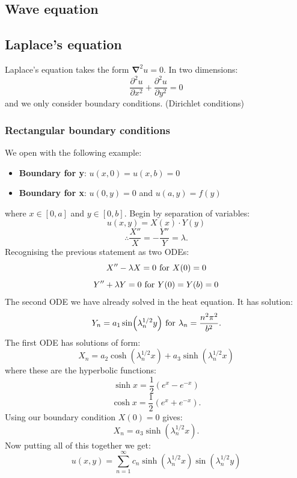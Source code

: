 \documentclass{article}
\begin{document}
\newpage

\subsection{Wave equation}

\newpage

\subsection{Laplace's equation}
Laplace's equation takes the form $\boldsymbol{\nabla}^2 u=0$. In two dimensions:
$$\frac{\partial^2 u}{\partial x^2}+\frac{\partial^2 u}{\partial y^2}=0$$
and we only consider boundary conditions. (Dirichlet conditions)

\subsubsection{Rectangular boundary conditions}
We open with the following example:
\begin{itemize}
    \item \textbf{Boundary for y}: $u(x,0)=u(x,b)=0$

    \item \textbf{Boundary for x}: $u(0,y)=0$ and $u(a,y)=f(y)$
\end{itemize}
where $x\in[0,a]$ and $y\in[0,b]$.
Begin by separation of variables:
$$u(x,y)=X(x)\cdot Y(y)$$
$$\therefore\frac{X''}{X}=-\frac{Y''}{Y}=\lambda.$$
Recognising the previous statement as two ODEs:
$$X''-\lambda X=0\hspace{0.05in}
\text{for}\hspace{0.05in}X(0)=0$$
$$Y''+\lambda Y=0\hspace{0.05in}\text{for}
\hspace{0.05in}Y(0)=Y(b)=0$$
The second ODE we have already solved in the heat equation. It has solution:
$$Y_n=a_1\sin(\lambda_n^{1/2} y)\hspace{0.05in}
\text{for}\hspace{0.05in}\lambda_n=\frac{n^2\pi^2}{b^2}.$$
The first ODE has solutions of form:
$$X_n=a_2\cosh(\lambda_n^{1/2}x)
+a_3\sinh(\lambda_n^{1/2}x)$$
where these are the hyperbolic functions:
$$\sinh x=\frac{1}{2}(e^x-e^{-x})$$
$$\cosh x=\frac{1}{2}(e^x+e^{-x}).$$
Using our boundary condition $X(0)=0$ gives:
$$X_n=a_3\sinh(\lambda_n^{1/2} x).$$
Now putting all of this together we get:
$$u(x,y)=\sum_{n=1}^{\infty}c_n\sinh(\lambda_n^{1/2} x)
\sin(\lambda_n^{1/2} y)$$

\newpage
\end{document}
